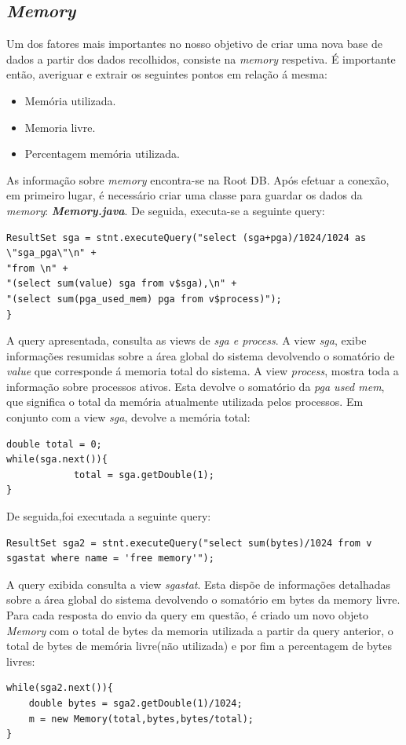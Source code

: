 \subsection*{\textit{Memory}}
Um dos fatores mais importantes no nosso objetivo de criar uma nova base de dados a partir dos dados recolhidos, consiste na \textit{memory} respetiva. É importante então, averiguar e extrair os seguintes pontos em relação á mesma:
\begin{itemize}
    \item Memória utilizada.
	\item Memoria livre.
	\item Percentagem memória utilizada.
\end{itemize}
As informação sobre \textit{memory} encontra-se na Root DB. Após efetuar a conexão, em primeiro lugar, é necessário criar uma classe para guardar os dados da \textit{memory}: \textbf{\textit{Memory.java}}. De seguida, executa-se a seguinte query:
\vspace{2mm}
\begin{lstlisting}
ResultSet sga = stnt.executeQuery("select (sga+pga)/1024/1024 as \"sga_pga\"\n" +
"from \n" +
"(select sum(value) sga from v$sga),\n" +
"(select sum(pga_used_mem) pga from v$process)");
}
\end{lstlisting}
\vspace{2mm}
A query apresentada, consulta as views de \textit{sga e process}. A view \textit{sga}, exibe informações resumidas sobre a área global do sistema devolvendo o somatório de \textit{value} que corresponde á memoria total do sistema. A view \textit{process}, mostra toda a informação sobre processos ativos. Esta devolve o somatório da \textit{pga used mem}, que significa o total da memória atualmente utilizada pelos processos. Em conjunto com a view \textit{sga}, devolve a memória total:
\vspace{2mm}
\begin{lstlisting}
double total = 0;
while(sga.next()){
            total = sga.getDouble(1);
}
\end{lstlisting}
\vspace{2mm}
De seguida,foi executada a seguinte query:
\vspace{2mm}
\begin{lstlisting}
ResultSet sga2 = stnt.executeQuery("select sum(bytes)/1024 from v sgastat where name = 'free memory'");
\end{lstlisting}
\vspace{2mm}
A query exibida consulta a view \textit{sgastat}. Esta dispõe de informações detalhadas sobre a área global do sistema devolvendo o somatório em bytes da memory livre. Para cada resposta do envio da query em questão,  é criado um novo objeto \textit{Memory} com o total de bytes da memoria utilizada a partir da query anterior, o total de bytes de memória livre(não utilizada) e por fim a percentagem de bytes livres:
\vspace{2mm}
\begin{lstlisting}
while(sga2.next()){
    double bytes = sga2.getDouble(1)/1024;
    m = new Memory(total,bytes,bytes/total); 
}
\end{lstlisting}
\vspace{2mm}
